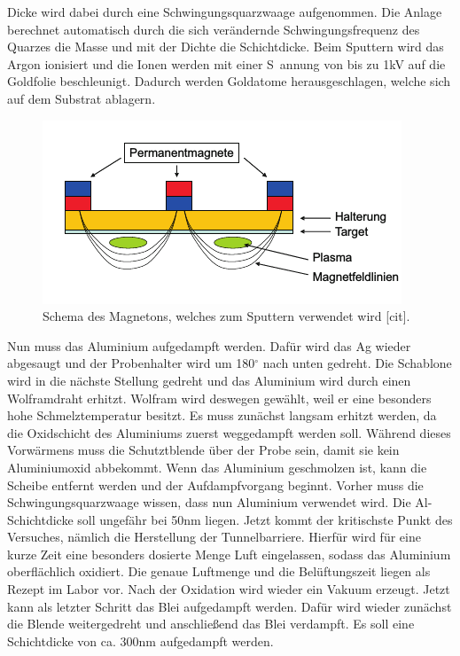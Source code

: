 \documentclass[twoside,        %
               BCOR12mm,       %
               english,ngerman, %
               fleqn,headsepline=false,footsepline=false
              ]{Vorlage/MFPREPORT}
\begin{document}
Dicke wird dabei durch eine Schwingungsquarzwaage aufgenommen. Die Anlage
berechnet automatisch durch die sich verändernde Schwingungsfrequenz des
Quarzes die Masse und mit der Dichte die Schichtdicke. Beim Sputtern wird das
Argon ionisiert und die Ionen werden mit einer S~annung von bis zu 1\;kV auf
die Goldfolie beschleunigt. Dadurch werden Goldatome herausgeschlagen, welche
sich auf dem Substrat ablagern. 
\begin{figure}[]
    \centering
    \includegraphics{fig/magneton.png}
    \caption{Schema des Magnetons, welches zum Sputtern verwendet wird [cit].}
    \label{fig:magneton}
\end{figure}
Nun muss das Aluminium aufgedampft werden.  Dafür wird das Ag wieder abgesaugt
und der Probenhalter wird um 180$^\circ$ nach unten gedreht. Die Schablone wird
in die nächste Stellung gedreht und das Aluminium wird durch einen Wolframdraht
erhitzt. Wolfram wird deswegen gewählt, weil er eine besonders hohe
Schmelztemperatur besitzt. Es muss zunächst langsam erhitzt werden, da die
Oxidschicht des Aluminiums zuerst weggedampft werden soll. Während dieses
Vorwärmens muss die Schutztblende über der Probe sein, damit sie kein
Aluminiumoxid abbekommt. Wenn das Aluminium geschmolzen ist, kann die Scheibe
entfernt werden und der Aufdampfvorgang beginnt. Vorher muss die
Schwingungsquarzwaage wissen, dass nun Aluminium verwendet wird.
Die Al-Schichtdicke soll ungefähr bei 50\;nm liegen.
Jetzt kommt der kritischste Punkt des Versuches, nämlich die Herstellung der
Tunnelbarriere. Hierfür wird für eine kurze Zeit eine besonders dosierte Menge
Luft eingelassen, sodass das Aluminium oberflächlich oxidiert. Die genaue
Luftmenge und die Belüftungszeit liegen als Rezept im Labor vor.
Nach der Oxidation wird wieder ein Vakuum erzeugt. Jetzt kann als letzter
Schritt das Blei aufgedampft werden. Dafür wird wieder zunächst die Blende
weitergedreht und anschließend das Blei verdampft. Es soll eine Schichtdicke
von ca. 300\;nm aufgedampft werden.
\end{document}

